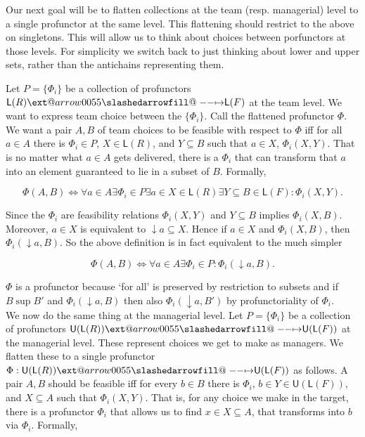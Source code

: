 \documentclass[12pt]{article}
\makeatletter
\theoremstyle{definition}
\theoremstyle{plain}
\theoremstyle{plain}
\theoremstyle{plain}
\theoremstyle{plain}
\theoremstyle{remark}
\theoremstyle{remark}
\newcommand{\sub}{\subseteq}
\newcommand{\low}{\mathsf{L}}
\newcommand{\upper}{\mathsf{U}}
\def\slashedarrowfill@#1#2#3#4#5{%
	$\m@th\thickmuskip0mu\medmuskip\thickmuskip\thinmuskip\thickmuskip
	\relax#5#1\mkern-7mu%
	\cleaders\hbox{$#5\mkern-2mu#2\mkern-2mu$}\hfill
	\mathclap{#3}\mathclap{#2}%
	\cleaders\hbox{$#5\mkern-2mu#2\mkern-2mu$}\hfill
	\mkern-7mu#4$%
}
\def\rightslashedarrowfill@{%
	\slashedarrowfill@\relbar\relbar\mapstochar\rightarrow}
\newcommand\xslashedrightarrow[2][]{%
	\ext@arrow 0055{\rightslashedarrowfill@}{#1}{#2}}
\makeatother
\begin{document}
Our next goal will be to flatten collections at the team (resp. managerial) level to a single profunctor at the same level. This flattening should restrict to the above on singletons. This will allow us to think about choices between porfunctors at those levels. For simplicity we switch back to just thinking about lower and upper sets, rather than the antichains representing them.

Let $P =\{\Phi_i\}$ be a collection of profunctors $\low(R) \xslashedrightarrow{} \low(F)$ at the team level. We want to express team choice between the $\{\Phi_i\}$. Call the flattened profunctor $\Phi$. We want a pair $A,B$ of team choices to be feasible with respect to $\Phi$ iff for all $a \in A$ there is $\Phi_i \in P$, $X \in \low(R)$, and $Y \sub B$ such that $a \in X$, $\Phi_i(X,Y)$. That is no matter what $a \in A$ gets delivered, there is a $\Phi_i$ that can transform that $a$ into an element guaranteed to lie in a subset of $B$. Formally,

$$ \Phi(A,B) \iff \forall a \in A \exists \Phi_i \in P \exists a \in X \in \low(R) \exists Y \sub B \in \low(F) : \Phi_i(X,Y).$$

Since the $\Phi_i$ are feasibility relations $\Phi_i(X,Y)$ and $Y \sub B$ implies $\Phi_i(X,B)$. Moreover, $a \in X$ is equivalent to $\downarrow a \sub X$. Hence if $a \in X$ and $\Phi_i(X,B)$, then $\Phi_i(\downarrow a,B)$. So the above definition is in fact equivalent to the much simpler

$$ \Phi(A,B) \iff \forall a \in A \exists \Phi_i \in P: \Phi_i(\downarrow a,B).$$

$\Phi$ is a profunctor because `for all' is preserved by restriction to subsets and if $B \sup B'$ and $\Phi_i(\downarrow a,B)$ then also  $\Phi_i(\downarrow a,B')$ by profunctoriality of $\Phi_i$. \\

We now do the same thing at the managerial level. Let $P =\{\Phi_i\}$ be a collection of profunctors $\upper(\low(R)) \xslashedrightarrow{} \upper(\low(F))$ at the managerial level. These represent choices we get to make as managers. We flatten these to a single profunctor $\Phi: \upper(\low(R)) \xslashedrightarrow{} \upper(\low(F))$ as follows. A pair $A,B$ should be feasible iff for every $b \in B$ there is $\Phi_i$, $b \in Y \in \upper(\low(F))$, and $X \sub A$ such that $\Phi_i(X,Y)$. That is, for any choice we make in the target, there is a profunctor $\Phi_i$ that allows us to find $x \in X \sub A$, that transforms into $b$ via $\Phi_i$. Formally,
\end{document}
